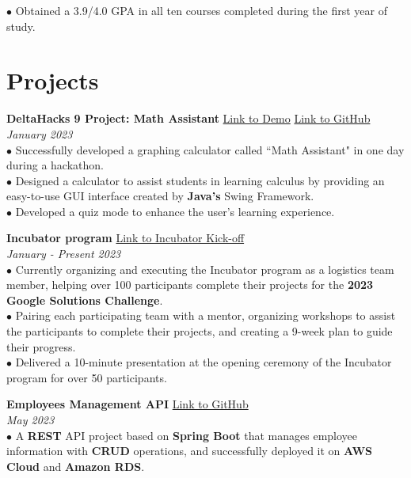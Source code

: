 \documentclass[letterpaper,12pt]{article}
\begin{document}
\hspace{0.3cm} $\bullet$ {\fontsize{10pt}{9pt}\selectfont Obtained a 3.9/4.0 GPA in all ten courses completed during the first year of study.}

\section{Projects}

\textbf{DeltaHacks 9 Project: Math Assistant} \hfill \href{https://devpost.com/software/math-helper-graphing-calculator}{Link to Demo} \hspace{0.2cm} \href{https://github.com/Zicheng-Li/Math_helper}{Link to GitHub} \\
\textit{January 2023} \\ 
\hspace{0.1cm} $\bullet$ Successfully developed a graphing calculator called ``Math Assistant" in one day during a hackathon. \\
\hspace{0.1cm} $\bullet$ Designed a calculator to assist students in learning calculus by providing an easy-to-use GUI interface created by \textbf{Java's} Swing Framework.\\ 
\hspace{0.1cm} $\bullet$ Developed a quiz mode to enhance the user's learning experience.

\textbf{Incubator program} \hfill \href{https://youtu.be/gJmWtfJp0Yc?t=345}{Link to Incubator Kick-off}\\
\textit{January - Present 2023}\\
\hspace{0.1cm} $\bullet$ Currently organizing and executing the Incubator program as a logistics team member, helping over 100 participants complete their projects for the \textbf{2023 Google Solutions Challenge}. \\
\hspace{0.1cm} $\bullet$ Pairing each participating team with a mentor, organizing workshops to assist the participants to complete their projects, and creating a 9-week plan to guide their progress. \\ 
\hspace{0.1cm} $\bullet$ Delivered a 10-minute presentation at the opening ceremony of the Incubator program for over 50 participants. 

\textbf{Employees Management API} \hfill \href{https://github.com/Zicheng-Li/employees-management-project}{Link to GitHub} \\
\textit{May 2023} \\ 
\hspace{0.1cm} $\bullet$ A \textbf{REST} API project based on \textbf{Spring Boot} that manages employee information with \textbf{CRUD} operations, and successfully deployed it on \textbf{AWS Cloud} and \textbf{Amazon RDS}.
\end{document}
